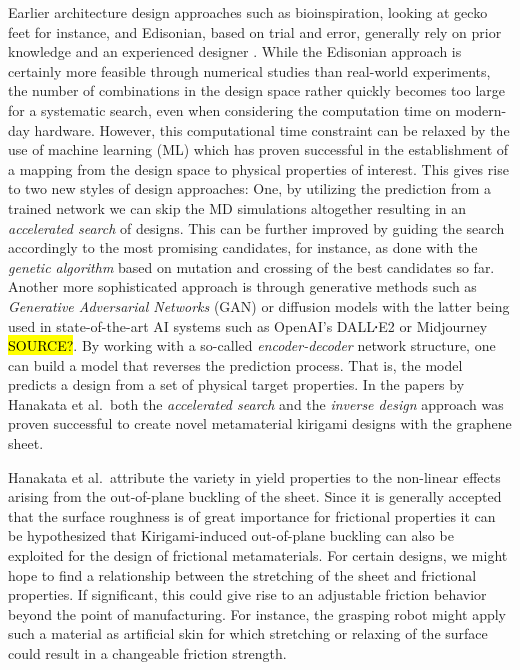 Earlier architecture design approaches such as bioinspiration, looking at gecko
feet for instance, and Edisonian, based on trial and error, generally rely on
prior knowledge and an experienced designer \cite{Mao}. While the Edisonian
approach is certainly more feasible through numerical studies than real-world
experiments, the number of combinations in the design space rather quickly
becomes too large for a systematic search, even when considering the computation
time on modern-day hardware. However, this computational time constraint can be
relaxed by the use of machine learning (\acrshort{ML}) which has proven
successful in the establishment of a mapping from the design space to physical
properties of interest. This gives rise to two new styles of design approaches:
One, by utilizing the prediction from a trained network we can skip the
\acrshort{MD} simulations altogether resulting in an \textit{accelerated search}
of designs. This can be further improved by guiding the search accordingly to
the most promising candidates, for instance, as done with the \textit{genetic
algorithm} based on mutation and crossing of the best candidates so far. Another
more sophisticated approach is through generative methods such as
\textit{Generative Adversarial Networks} (GAN) or diffusion models with the
latter being used in state-of-the-art AI systems such as OpenAI's DALL$\sq$E2 or
Midjourney \hl{SOURCE?}. By working with a so-called \textit{encoder-decoder}
network structure, one can build a model that reverses the prediction process.
That is, the model predicts a design from a set of physical target properties.
In the papers by Hanakata et al.\ both the \textit{accelerated search} and the
\textit{inverse design} approach was proven successful to create novel
metamaterial kirigami designs with the graphene sheet. 

Hanakata et al.\ attribute the variety in yield properties to the non-linear
effects arising from the out-of-plane buckling of the sheet. Since it is
generally accepted that the surface roughness is of great importance for
frictional properties it can be hypothesized that Kirigami-induced out-of-plane buckling can also be exploited for the design of frictional metamaterials. For
certain designs, we might hope to find a relationship between the stretching of the
sheet and frictional properties. If significant, this could give rise to an adjustable friction behavior beyond the point of manufacturing. For
instance, the grasping robot might apply such a material as artificial skin for
which stretching or relaxing of the surface could result in a changeable friction strength.

